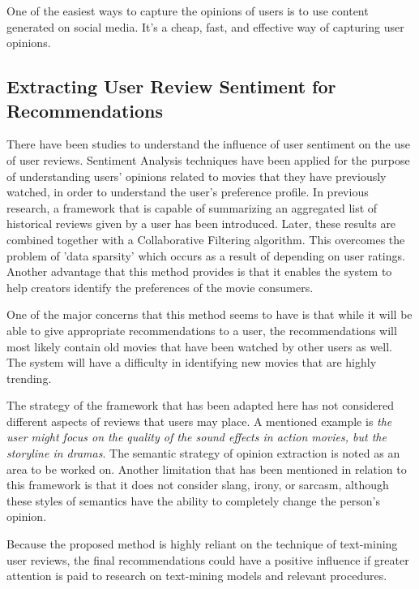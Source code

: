 \documentclass[manuscript,screen,natbib=false]{acmart}
\begin{document}
One of the easiest ways to capture the opinions of users is to use content generated on social media. It's a cheap, fast, and effective way of capturing user opinions.


\subsection{Extracting User Review Sentiment for Recommendations}
There have been studies to understand the influence of user sentiment on the use of user reviews.
Sentiment Analysis techniques have been applied for the purpose of understanding users' opinions related to movies that they have previously watched, in order to understand the user's preference profile. In previous research, \cite{cheng_hybrid_2020} a framework that is capable of summarizing an aggregated list of historical reviews given by a user has been introduced. Later, these results are combined together with a Collaborative Filtering algorithm. This overcomes the problem of 'data sparsity' which occurs as a result of depending on user ratings. 
Another advantage that this method provides is that it enables the system to help creators identify the preferences of the movie consumers.

One of the major concerns that this method seems to have is that while it will be able to give appropriate recommendations to a user, the recommendations will most likely contain old movies that have been watched by other users as well. The system will have a difficulty in identifying new movies that are highly trending.

The strategy of the framework that has been adapted here has not considered different aspects of reviews that users may place. A mentioned example is \emph{the user might focus on the quality of the sound effects in action movies, but the storyline in dramas}. The semantic strategy of opinion extraction is noted as an area to be worked on. Another limitation that has been mentioned in relation to this framework is that it does not consider slang, irony, or sarcasm, although these styles of semantics have the ability to completely change the person's opinion.

Because the proposed method is highly reliant on the technique of text-mining user reviews, the final recommendations could have a positive influence if greater attention is paid to research on text-mining models and relevant procedures.
\end{document}
